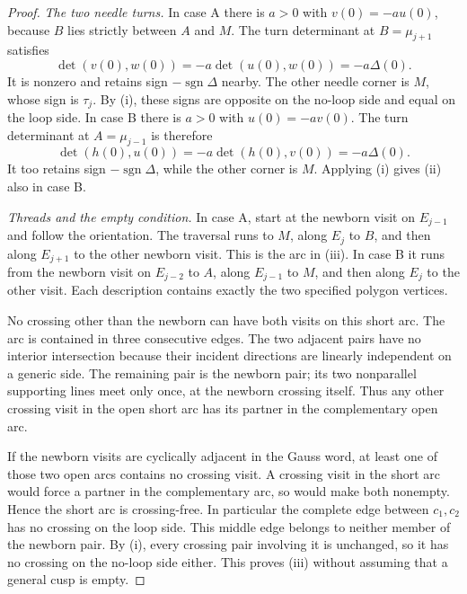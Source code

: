 \begin{proof}
\emph{The two needle turns.}
In case A there is $a>0$ with $v(0)=-a u(0)$, because $B$ lies strictly
between $A$ and $M$. The turn determinant at $B=\mu_{j+1}$ satisfies
\begin{equation}\label{cusppr:A-needle}
\det(v(0),w(0))=-a\det(u(0),w(0))=-a\Delta(0).
\end{equation}
It is nonzero and retains sign $-\operatorname{sgn}\Delta$ nearby.
The other needle corner is $M$, whose sign is $\tau_j$. By (i), these
signs are opposite on the no-loop side and equal on the loop side.
In case B there is $a>0$ with $u(0)=-a v(0)$. The turn determinant at
$A=\mu_{j-1}$ is therefore
\begin{equation}\label{cusppr:B-needle}
\det(h(0),u(0))=-a\det(h(0),v(0))=-a\Delta(0).
\end{equation}
It too retains sign $-\operatorname{sgn}\Delta$, while the other corner
is $M$. Applying (i) gives (ii) also in case B.

\emph{Threads and the empty condition.}
In case A, start at the newborn visit on $E_{j-1}$ and follow the
orientation. The traversal runs to $M$, along $E_j$ to $B$, and then
along $E_{j+1}$ to the other newborn visit. This is the arc in (iii).
In case B it runs from the newborn visit on $E_{j-2}$ to $A$, along
$E_{j-1}$ to $M$, and then along $E_j$ to the other visit.
Each description contains exactly the two specified polygon vertices.

No crossing other than the newborn can have both visits on this short
arc. The arc is contained in three consecutive edges. The two adjacent
pairs have no interior intersection because their incident directions
are linearly independent on a generic side. The remaining pair is the
newborn pair; its two nonparallel supporting lines meet only once, at
the newborn crossing itself. Thus any other crossing visit in the open
short arc has its partner in the complementary open arc.

If the newborn visits are cyclically adjacent in the Gauss word, at
least one of those two open arcs contains no crossing visit. A crossing
visit in the short arc would force a partner in the complementary arc,
so would make both nonempty. Hence the short arc is crossing-free.
In particular the complete edge between $c_1,c_2$ has no crossing on the
loop side. This middle edge belongs to neither member of the newborn
pair. By (i), every crossing pair involving it is unchanged, so it has
no crossing on the no-loop side either. This proves (iii) without
assuming that a general cusp is empty.


\end{proof}
